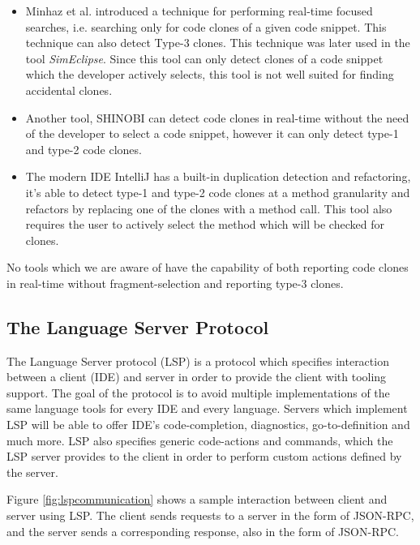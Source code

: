 \documentclass[12pt]{article}
\begin{document}
\begin{itemize}
	\item Minhaz et al. introduced a technique for performing real-time focused
	      searches, i.e. searching only for code clones of a given code snippet. This
	      technique can also detect Type-3 clones\cite{Zibran_real_time_search}.
	      This technique was later used in the tool
	      \textit{SimEclipse}\cite{Udding_Towards_Convenient_Management}. Since this tool
	      can only detect clones of a code snippet which the developer actively selects, this tool is
	      not well suited for finding accidental clones.

	\item Another tool, SHINOBI can detect code clones in real-time without the need
	      of the developer to select a code snippet, however it can only detect type-1
	      and type-2 code clones\cite{SHINOBI}.
	\item The modern IDE IntelliJ has a built-in duplication detection and
	      refactoring, it's able to detect type-1 and type-2 code clones at a method
	      granularity and refactors by replacing one of the clones with a method call.
	      This tool also requires the user to actively select the method which will be
	      checked for clones.
\end{itemize}

No tools which we are aware of have the capability of both reporting code clones in
real-time without fragment-selection and reporting type-3 clones.

\subsection{The Language Server Protocol}

The Language Server protocol (LSP) is a protocol which specifies interaction between a
client (IDE) and server in order to provide the client with tooling support. The goal of
the protocol is to avoid multiple implementations of the same language tools for every
IDE and every language. Servers which implement LSP will be able to offer IDE's
code-completion, diagnostics, go-to-definition and much more. LSP also specifies generic
code-actions and commands, which the LSP server provides to the client in order to perform
custom actions defined by the server.

Figure \ref{fig:lspcommunication} shows a sample interaction between client and server
using LSP. The client sends requests to a server in the form of JSON-RPC, and the server
sends a corresponding response, also in the form of JSON-RPC.
\end{document}
